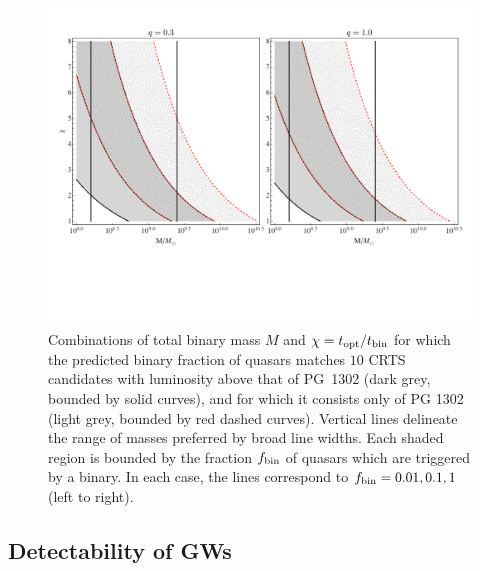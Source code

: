\begin{figure}
\begin{center}
\includegraphics[scale=0.23]{figures/ch3/fig3} \vspace{-15 pt}
\end{center}
\caption{Combinations of total binary mass $M$ and $\chi = t_{\rm
    opt}/t_{\rm{bin}}$ for which the predicted binary fraction of quasars
  matches $10$ CRTS candidates with luminosity above that of PG~1302
  (dark grey, bounded by solid curves), and for which it consists only
  of PG 1302 (light grey, bounded by red dashed curves). Vertical lines
  delineate the range of masses preferred by broad line widths. Each
  shaded region is bounded by the fraction $f_{\rm{bin}}$ of
  quasars which are triggered by a binary. In each case, the
  lines correspond to $f_{\rm{bin}} = 0.01,0.1,1$ (left to right).}
\label{Fig:Rates}
\end{figure}





\subsection{Detectability of GWs} 
\label{SS:GWs}


